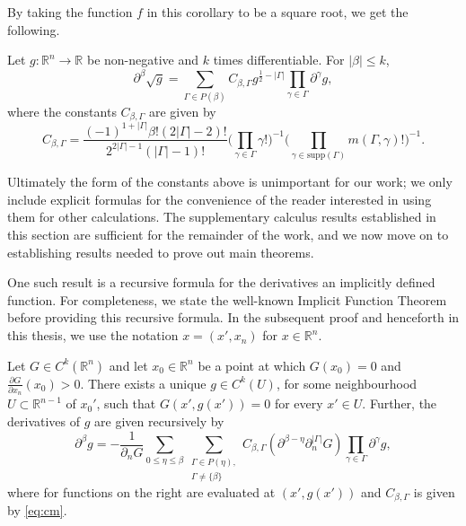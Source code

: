 \documentclass[oneside,hidelinks,indentfirst,10pt]{book}
\begin{document}
By taking the function \(f\) in this corollary to be a square root, we get the following.


\begin{cor}\label{cor:rootscor}
Let \(g:\mathbb{R}^n\rightarrow\mathbb{R}\) be non-negative and \(k\) times differentiable. For \(|\beta|\leq k\),
\[
    \partial^\beta \sqrt{g} =\sum_{\Gamma\in P(\beta)}C_{\beta,\Gamma}g^{\frac{1}{2}-|\Gamma|}\prod_{\gamma\in\Gamma}\partial^\gamma g,
\]
where the constants \(C_{\beta,\Gamma}\) are given by
\[
    C_{\beta,\Gamma}=\frac{(-1)^{1+|\Gamma|}\beta!\left(2|\Gamma|-2\right)!}{2^{2|\Gamma|-1}(|\Gamma|-1)!}\bigg(\prod_{\gamma\in\Gamma}\gamma!\bigg)^{-1}\bigg(\prod_{\gamma\in\mathrm{supp}(\Gamma)}m(\Gamma,\gamma)!\bigg)^{-1}.
\]
\end{cor}

Ultimately the form of the constants above is unimportant for our work; we only include explicit formulas for the convenience of the reader interested in using them for other calculations. The supplementary calculus results established in this section are sufficient for the remainder of the work, and we now move on to establishing results needed to prove out main theorems.


One such result is a recursive formula for the derivatives an implicitly defined function. For completeness, we state the well-known Implicit Function Theorem before providing this recursive formula. In the subsequent proof and henceforth in this thesis, we use the notation \(x=(x',x_n)\) for \(x\in\mathbb{R}^n\).


\begin{thm}\label{thm:IFT}
Let \(G\in C^k(\mathbb{R}^n)\) and let \(x_0\in\mathbb{R}^n\) be a point at which \(G(x_0)=0\) and \(\frac{\partial G}{\partial x_n}(x_0)>0\). There exists a unique \(g\in C^k(U)\), for some neighbourhood \(U\subset\mathbb{R}^{n-1}\) of \(x_0'\), such that \(G(x',g(x'))=0\) for every \(x'\in U\). Further, the derivatives of \(g\) are given recursively by
\[
    \partial^\beta g=-\frac{1}{\partial_{n}G}\sum_{0\leq\eta\leq\beta}\sum_{ \substack{\Gamma\in P(\eta),\\\Gamma\neq \{\beta\}}}C_{\beta,\Gamma}(\partial^{\beta-\eta}\partial^{|\Gamma|}_nG)\prod_{\gamma\in\Gamma}\partial^\gamma g,
\]
where for functions on the right are evaluated at \((x',g(x'))\) and \(C_{\beta,\Gamma}\) is given by \eqref{eq:cm}.
\end{thm}
\end{document}
